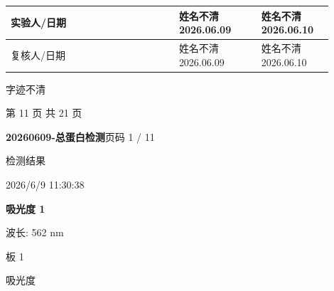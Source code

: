 \documentclass[UTF8,10pt,a4paper,fontset=fandol]{ctexart}
\newcommand{\fieldvalue}[1]{#1}
\newcommand{\handwritten}[1]{#1}
\begin{document}
\begin{tabular}{|p{0.47\linewidth}|p{0.23\linewidth}|p{0.20\linewidth}|}
实验人/日期 &
\fieldvalue{\handwritten{姓名不清}}%
\quad
\fieldvalue{\handwritten{2026.06.09}} &
\fieldvalue{\handwritten{姓名不清}}%
\quad
\fieldvalue{\handwritten{2026.06.10}} \\
\hline
复核人/日期 &
\fieldvalue{\handwritten{姓名不清}}%
\quad
\fieldvalue{\handwritten{2026.06.09}} &
\fieldvalue{\handwritten{姓名不清}}%
\quad
\fieldvalue{\handwritten{2026.06.10}} \\
\hline
\end{tabular}

\fieldvalue{\handwritten{字迹不清}} 

\begin{center}
第 11 页 共 21 页
\end{center}

\newpage

\begin{flushleft}
\textbf{20260609-总蛋白检测}\hfill 页码 1 / 11

\vspace{0.4em}
检测结果

2026/6/9 11:30:38

\vspace{0.4em}
\textbf{吸光度 1}

波长: 562 nm

\vspace{0.4em}
板 1

吸光度
\end{flushleft}
\end{document}
